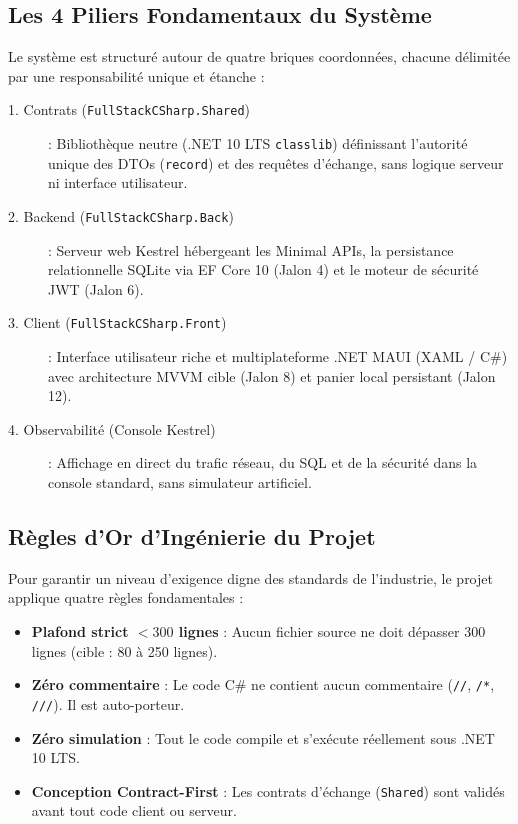 \subsection*{Les 4 Piliers Fondamentaux du Système}

Le système est structuré autour de quatre briques coordonnées, chacune délimitée par une responsabilité unique et étanche :

\begin{description}
    \item[\color{cyanproj!90!black}1. Contrats (\texttt{FullStackCSharp.Shared})] : Bibliothèque neutre (.NET 10 LTS \texttt{classlib}) définissant l'autorité unique des DTOs (\texttt{record}) et des requêtes d'échange, sans logique serveur ni interface utilisateur.
    \item[\color{secondary}2. Backend (\texttt{FullStackCSharp.Back})] : Serveur web Kestrel hébergeant les Minimal APIs, la persistance relationnelle SQLite via EF Core 10 (Jalon 4) et le moteur de sécurité JWT (Jalon 6).
    \item[\color{indigo}3. Client (\texttt{FullStackCSharp.Front})] : Interface utilisateur riche et multiplateforme .NET MAUI (XAML / C\#) avec architecture MVVM cible (Jalon 8) et panier local persistant (Jalon 12).
    \item[\color{emerald!80!black}4. Observabilité (Console Kestrel)] : Affichage en direct du trafic réseau, du SQL et de la sécurité dans la console standard, sans simulateur artificiel.
\end{description}

\vspace{0.15cm}

\subsection*{Règles d'Or d'Ingénierie du Projet}

Pour garantir un niveau d'exigence digne des standards de l'industrie, le projet applique quatre règles fondamentales :
\begin{itemize}
    \item \textbf{Plafond strict $< 300$ lignes} : Aucun fichier source ne doit dépasser 300 lignes (cible : 80 à 250 lignes).
    \item \textbf{Zéro commentaire} : Le code C\# ne contient aucun commentaire (\texttt{//}, \texttt{/*}, \texttt{///}). Il est auto-porteur.
    \item \textbf{Zéro simulation} : Tout le code compile et s'exécute réellement sous .NET 10 LTS.
    \item \textbf{Conception Contract-First} : Les contrats d'échange (\texttt{Shared}) sont validés avant tout code client ou serveur.
\end{itemize}

